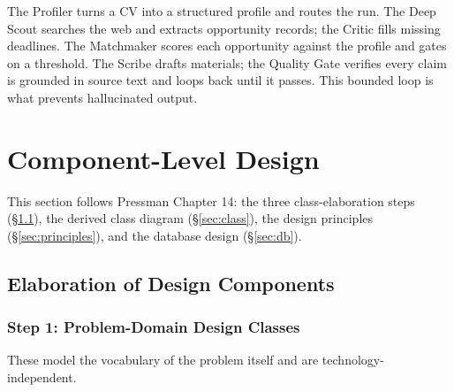 \documentclass[11pt,a4paper]{article}
\begin{document}
\begin{center}
\end{center}

\noindent The Profiler turns a CV into a structured profile and routes the run. The Deep
Scout searches the web and extracts opportunity records; the Critic fills missing deadlines.
The Matchmaker scores each opportunity against the profile and gates on a threshold. The
Scribe drafts materials; the Quality Gate verifies every claim is grounded in source text
and loops back until it passes. This bounded loop is what prevents hallucinated output.

\section{Component-Level Design}
This section follows Pressman Chapter 14: the three class-elaboration steps
(\S\ref{sec:steps}), the derived class diagram (\S\ref{sec:class}), the design principles
(\S\ref{sec:principles}), and the database design (\S\ref{sec:db}).

\subsection{Elaboration of Design Components}\label{sec:steps}

\subsubsection{Step 1: Problem-Domain Design Classes}
These model the vocabulary of the problem itself and are technology-independent.
\end{document}
